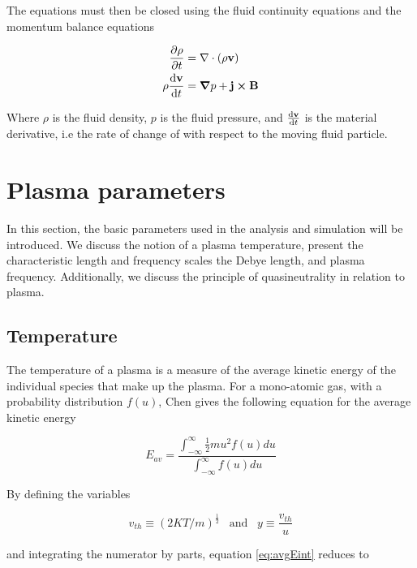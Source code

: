 The equations must then be closed using the fluid continuity equations and the momentum balance equations

\begin{subequations}
    \begin{align}
        \pdv{\rho}{t} &= \nabla \cdot (\rho \vb{v}) \\
        \rho \dv{\vb{v}}{t} &= \grad{p} + \vb{j} \cross \vb{B}
    \end{align}
\end{subequations}

Where $\rho$ is the fluid density, $p$ is the fluid pressure, and $\dv{\vb{v}}{t}$ is the material derivative, i.e the rate of change of with respect to the moving fluid particle.


\section{Plasma parameters}\label{subsec:pParam}
In this section, the basic parameters used in the analysis and simulation will be introduced. We discuss the notion of a plasma temperature, present the characteristic length and frequency scales the Debye length, and plasma frequency. Additionally, we discuss the principle of quasineutrality in relation to plasma. 

\subsection{Temperature}\label{subsec:temperature}
The temperature of a plasma is a measure of the average kinetic energy of the individual species that make up the plasma. For a mono-atomic gas, with a probability distribution $f(u)$, Chen \parencite[Section 1.3]{Chen2018} gives the following equation for the average kinetic energy

\begin{equation}\label{eq:avgEint}
    E_{av} = \frac{\int^\infty_{-\infty} \frac{1}{2} m u^2 f(u) du}{\int^\infty_{-\infty} f(u) du}
\end{equation}


By defining the variables 

\begin{equation*}
    v_{th} \equiv (2 K T / m)^{\frac{1}{2}} \hspace{10pt} \text{and} \hspace{10pt} y \equiv \frac{v_{th}}{u}
\end{equation*}
    
and integrating the numerator by parts, equation \eqref{eq:avgEint} reduces to

